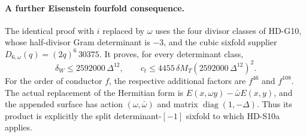 \paragraph{A further Eisenstein fourfold consequence.}
The identical proof with \(i\) replaced by \(\omega\) uses
the four divisor classes of HD-G10, whose half-divisor Gram
determinant is \(-3\), and the cubic sixfold supplier
\(D_{6,\omega}(q)=(2q)^6\,30375\).
It proves, for every determinant class,
\[
 \delta_W\le2592000\,\Delta^{12},\qquad
 c_t\le4455\,\delta M_T(2592000\,\Delta^{12})^2.
\]
For the order of conductor \(f\), the respective additional
factors are \(f^{46}\) and \(f^{108}\). The actual replacement
of the Hermitian form is
\(E(x,\omega y)-\bar\omega E(x,y)\), and the appended surface
has action \((\omega,\bar\omega)\) and matrix
\(\operatorname{diag}(1,-\Delta)\). Thus its product is
explicitly the split determinant-\([-1]\) sixfold to which
HD-S10a applies.

